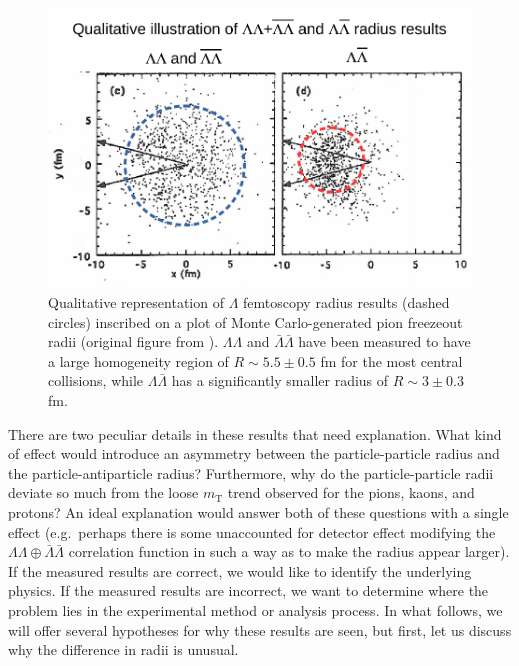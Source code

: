 \begin{figure}[hbt]
\includegraphics[width=36pc]{Figures/BorrowedFigures/HomogeneityRegionQualitative.pdf}
\caption[Qualitative interpretation of radius results]{
Qualitative representation of $\Lambda$ femtoscopy radius results (dashed circles) inscribed on a plot of Monte Carlo-generated pion freezeout radii (original figure from \cite{Humanic:2005ye}).
$\Lambda\Lambda$ and $\bar{\Lambda}\bar{\Lambda}$ have been measured to have a large homogeneity region of $R \sim 5.5 \pm 0.5$ fm for the most central collisions, while $\Lambda\bar{\Lambda}$ has a significantly smaller radius of $R \sim 3 \pm 0.3$ fm.
}
\label{fig:QualitativeIllustrationRadii}
\end{figure}

There are two peculiar details in these results that need explanation.
What kind of effect would introduce an asymmetry between the particle-particle radius and the particle-antiparticle radius? 
Furthermore, why do the particle-particle radii deviate so much from the loose $m_\mathrm{T}$ trend observed for the pions, kaons, and protons?
An ideal explanation would answer both of these questions with a single effect (e.g.\ perhaps there is some unaccounted for detector effect modifying the $\Lambda\Lambda\oplus\bar{\Lambda}\bar{\Lambda}$ correlation function in such a way as to make the radius appear larger).
If the measured results are correct, we would like to identify the underlying physics.
If the measured results are incorrect, we want to determine where the problem lies in the experimental method or analysis process.
In what follows, we will offer several hypotheses for why these results are seen, but first, let us discuss why the difference in radii is unusual.

